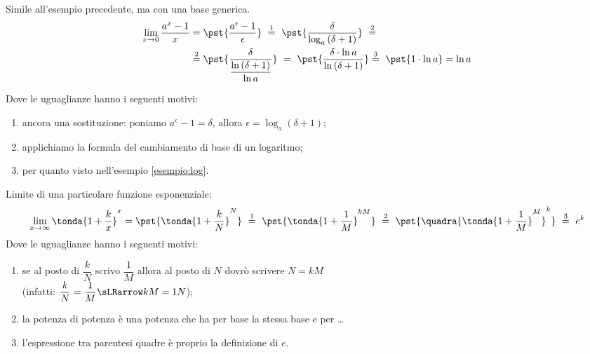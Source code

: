 \begin{esempio}
Simile all'esempio precedente, ma con una base generica.
\begin{align*}
\lim_{x \rightarrow 0} \dfrac{a^x-1}{x} &=
\pst{\dfrac{a^\epsilon-1}{\epsilon}}
~ \stackrel{1}{=} ~  
\pst{\dfrac{\delta}{\log_a{(\delta+1)}}}~ \stackrel{2}{=}\\
&\stackrel{2}{=} 
\pst{\frac{\delta}{\dfrac{\ln{(\delta+1)}}{\ln a}}} ~=~
\pst{\frac{\delta \cdot \ln a}{\ln{(\delta+1)}}} %
\stackrel{3}{=} ~ 
\pst{1 \cdot \ln a}=\ln{a}
\end{align*}

Dove le uguaglianze hanno i seguenti motivi:
\begin{enumerate} [nosep]
 \item ancora una sostituzione: poniamo
\(a^\epsilon-1=\delta\), allora \(\epsilon=\log_a(\delta+1)\);
 \item applichiamo la formula del cambiamento di base di un logaritmo; 
 \item per quanto visto nell'esempio \ref{esempio:log}.
\end{enumerate}
\end{esempio}

\begin{esempio}
Limite di una particolare funzione esponenziale:
\begin{align*}
 \lim_{x \rightarrow \infty} \tonda{1+\dfrac{k}{x}}^x =
 \pst{\tonda{1+\dfrac{k}{N}}^N}
~ \stackrel{1}{=} ~  
\pst{\tonda{1+\dfrac{1}{M}}^{kM}}
~ \stackrel{2}{=} ~
\pst{\quadra{\tonda{1+\dfrac{1}{M}}^M}^k}
~ \stackrel{3}{=} ~ e^k
\end{align*}
Dove le uguaglianze hanno i seguenti motivi:
\begin{enumerate} [nosep]
 \item se al posto di \(\dfrac{k}{N}\) scrivo \(\dfrac{1}{M}\) 
allora al posto di \(N\) dovrò scrivere \(N=kM\)\\ 
(infatti: \(\dfrac{k}{N}=\dfrac{1}{M} \sLRarrow kM=1N\));
 \item la potenza di potenza è una potenza che ha per base la stessa base 
e per \dots
 \item l'espressione tra parentesi quadre è proprio la definizione di \(e\).
\end{enumerate}
\end{esempio}

\newpage %
